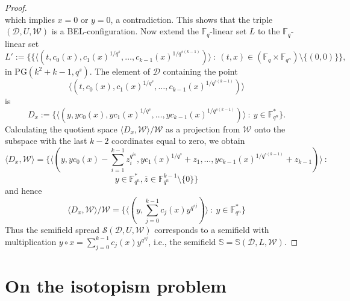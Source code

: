 \documentclass[12pt]{amsart}
\def\F{\mathbb{F}}
\def\PG{\mathrm{PG}}
\def\S{\mathbb{S}}
\def\W{\mathcal{W}}
\def\D{\mathcal{D}}
\begin{document}
\begin{proof}
$$$$
which implies $x=0$ or $y=0$, a contradiction. This shows that the triple $(\D,U,\W)$ is a BEL-configuration. Now extend the $\F_q$-linear set $L$ to the $\F_q$-linear set
$$
L':=\{\{\langle(t,c_0(x),c_1(x)^{1/q^s},\ldots,c_{k-1}(x)^{1/q^{s(k-1)}})\rangle ~:~(t,x) \in (\F_q\times \F_{q^n})\setminus\{(0,0)\}\},
$$
in $\PG(k^2+k-1,q^s)$. The element of $\D$ containing the point 
$$\langle(t,c_0(x),c_1(x)^{1/q^s},\ldots,c_{k-1}(x)^{1/q^{s(k-1)}})\rangle$$ 
is 
$$D_x:=\{\langle(y,yc_0(x),yc_1(x)^{1/q^s},\ldots,yc_{k-1}(x)^{1/q^{s(k-1)}})\rangle~:~y \in \F_{q^n}^*\}.$$
Calculating the quotient space $\langle D_x,\W\rangle /\W$ as a projection from $\W$ onto the subspace with the last $k-2$ coordinates equal to zero, we obtain
$$
\langle D_x,\W\rangle=\{
\langle(y,yc_0(x)-\sum_{i=1}^{k-1} z_i^{q^{is}},yc_1(x)^{1/q^s}+z_1,\ldots,yc_{k-1}(x)^{1/q^{s(k-1)}}+z_{k-1})\rangle~:~
$$
$$
y \in \F_{q^n}^*, \overline{z} \in \F_{q^n}^{k-1}\setminus\{0\}\}
$$
and hence
$$
\langle D_x,\W\rangle/\W=\{\langle ( y, \sum_{j = 0}^{k-1}c_j(x)y^{q^{sj}})\rangle  ~:~y \in \F_{q^n}^*\}
$$
Thus the semifield spread ${\mathcal{S}}(\D,U,\W)$ corresponds to a semifield with multiplication
$y\circ x = \sum_{j = 0}^{k-1}c_j(x)y^{q^{sj}}$, i.e., the semifield $\S=\S(\D,L,\W)$.
\end{proof}



\section{On the isotopism problem}
\end{document}
